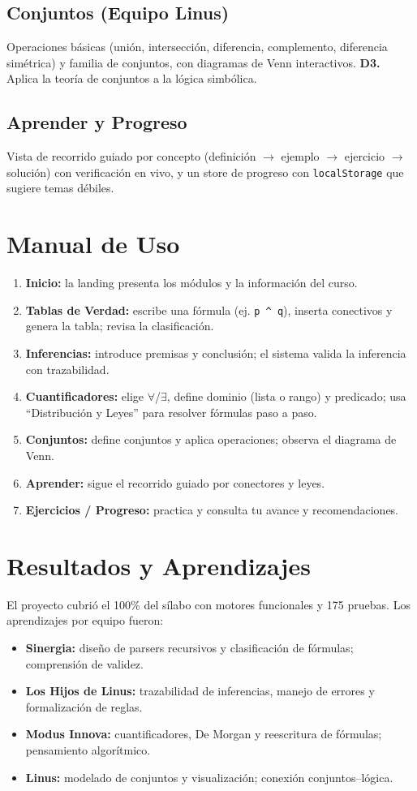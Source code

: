\documentclass[12pt,a4paper]{article}
\begin{document}
\subsection{Conjuntos (Equipo Linus)}
Operaciones básicas (unión, intersección, diferencia, complemento, diferencia simétrica) y familia de
conjuntos, con diagramas de Venn interactivos. \textbf{D3.} Aplica la teoría de conjuntos a la lógica
simbólica.

\subsection{Aprender y Progreso}
Vista de recorrido guiado por concepto (definición $\to$ ejemplo $\to$ ejercicio $\to$ solución) con
verificación en vivo, y un store de progreso con \texttt{localStorage} que sugiere temas débiles.

\section{Manual de Uso}
\begin{enumerate}
  \item \textbf{Inicio:} la landing presenta los módulos y la información del curso.
  \item \textbf{Tablas de Verdad:} escribe una fórmula (ej. \texttt{p \^{} q}), inserta conectivos y
    genera la tabla; revisa la clasificación.
  \item \textbf{Inferencias:} introduce premisas y conclusión; el sistema valida la inferencia con trazabilidad.
  \item \textbf{Cuantificadores:} elige $\forall$/$\exists$, define dominio (lista o rango) y
    predicado; usa ``Distribución y Leyes'' para resolver fórmulas paso a paso.
  \item \textbf{Conjuntos:} define conjuntos y aplica operaciones; observa el diagrama de Venn.
  \item \textbf{Aprender:} sigue el recorrido guiado por conectores y leyes.
  \item \textbf{Ejercicios / Progreso:} practica y consulta tu avance y recomendaciones.
\end{enumerate}

\section{Resultados y Aprendizajes}
El proyecto cubrió el 100\% del sílabo con motores funcionales y 175 pruebas. Los aprendizajes por
equipo fueron:
\begin{itemize}
  \item \textbf{Sinergia:} diseño de parsers recursivos y clasificación de fórmulas; comprensión de validez.
  \item \textbf{Los Hijos de Linus:} trazabilidad de inferencias, manejo de errores y formalización de reglas.
  \item \textbf{Modus Innova:} cuantificadores, De Morgan y reescritura de fórmulas; pensamiento algorítmico.
  \item \textbf{Linus:} modelado de conjuntos y visualización; conexión conjuntos--lógica.
\end{itemize}
\end{document}
